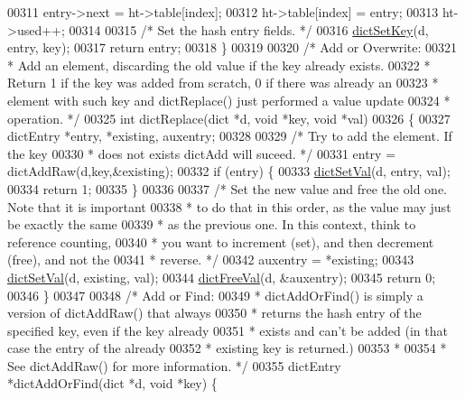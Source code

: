 \begin{DoxyCode}
00311     entry->next = ht->table[index];
00312     ht->table[index] = entry;
00313     ht->used++;
00314 
00315     \textcolor{comment}{/* Set the hash entry fields. */}
00316     \hyperlink{dict_8h_a827e5dcfd37bba408fa8bdb111b0594e}{dictSetKey}(d, entry, key);
00317     \textcolor{keywordflow}{return} entry;
00318 \}
00319 
00320 \textcolor{comment}{/* Add or Overwrite:}
00321 \textcolor{comment}{ * Add an element, discarding the old value if the key already exists.}
00322 \textcolor{comment}{ * Return 1 if the key was added from scratch, 0 if there was already an}
00323 \textcolor{comment}{ * element with such key and dictReplace() just performed a value update}
00324 \textcolor{comment}{ * operation. */}
00325 \textcolor{keywordtype}{int} dictReplace(dict *d, \textcolor{keywordtype}{void} *key, \textcolor{keywordtype}{void} *val)
00326 \{
00327     dictEntry *entry, *existing, auxentry;
00328 
00329     \textcolor{comment}{/* Try to add the element. If the key}
00330 \textcolor{comment}{     * does not exists dictAdd will suceed. */}
00331     entry = dictAddRaw(d,key,&existing);
00332     \textcolor{keywordflow}{if} (entry) \{
00333         \hyperlink{dict_8h_a95cae6581aca3a7a4c5e226e565294c9}{dictSetVal}(d, entry, val);
00334         \textcolor{keywordflow}{return} 1;
00335     \}
00336 
00337     \textcolor{comment}{/* Set the new value and free the old one. Note that it is important}
00338 \textcolor{comment}{     * to do that in this order, as the value may just be exactly the same}
00339 \textcolor{comment}{     * as the previous one. In this context, think to reference counting,}
00340 \textcolor{comment}{     * you want to increment (set), and then decrement (free), and not the}
00341 \textcolor{comment}{     * reverse. */}
00342     auxentry = *existing;
00343     \hyperlink{dict_8h_a95cae6581aca3a7a4c5e226e565294c9}{dictSetVal}(d, existing, val);
00344     \hyperlink{dict_8h_a4a90ee4c2d8391f2d6f9c65ccf4ba037}{dictFreeVal}(d, &auxentry);
00345     \textcolor{keywordflow}{return} 0;
00346 \}
00347 
00348 \textcolor{comment}{/* Add or Find:}
00349 \textcolor{comment}{ * dictAddOrFind() is simply a version of dictAddRaw() that always}
00350 \textcolor{comment}{ * returns the hash entry of the specified key, even if the key already}
00351 \textcolor{comment}{ * exists and can't be added (in that case the entry of the already}
00352 \textcolor{comment}{ * existing key is returned.)}
00353 \textcolor{comment}{ *}
00354 \textcolor{comment}{ * See dictAddRaw() for more information. */}
00355 dictEntry *dictAddOrFind(dict *d, \textcolor{keywordtype}{void} *key) \{

\end{DoxyCode}
